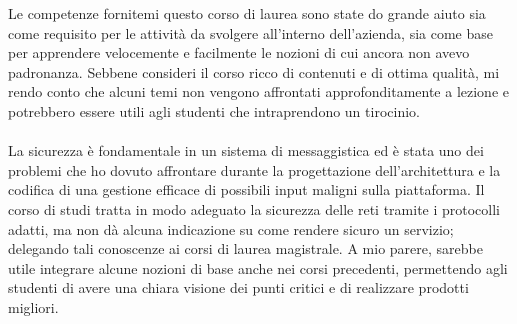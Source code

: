 Le competenze fornitemi questo corso di laurea sono state do grande aiuto sia come requisito per le attività da svolgere all'interno dell'azienda, sia come base per apprendere velocemente e facilmente le nozioni di cui ancora non avevo padronanza. Sebbene consideri il corso ricco di contenuti e di ottima qualità, mi rendo conto che alcuni temi non vengono affrontati approfonditamente a lezione e potrebbero essere utili agli studenti che intraprendono un tirocinio.
\paragraph*{} La sicurezza è fondamentale in un sistema di messaggistica ed è stata uno dei problemi che ho dovuto affrontare durante la progettazione dell'architettura e la codifica di una gestione efficace di possibili input maligni sulla piattaforma. Il corso di studi tratta in modo adeguato la sicurezza delle reti tramite i protocolli adatti, ma non dà alcuna indicazione su come rendere sicuro un servizio; delegando tali conoscenze ai corsi di laurea magistrale. A mio parere, sarebbe utile integrare alcune nozioni di base anche nei corsi precedenti, permettendo agli studenti di avere una chiara visione dei punti critici e di realizzare prodotti migliori.